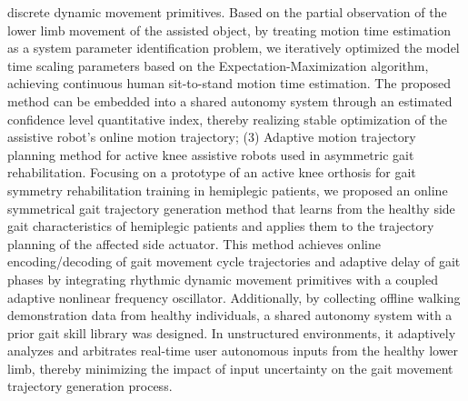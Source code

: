 \begin{abstract*}
discrete dynamic movement primitives. Based on the partial observation of the lower limb movement of the assisted object, by treating motion time estimation as a system parameter identification problem, we iteratively optimized the model time scaling parameters based on the Expectation-Maximization algorithm, achieving continuous human sit-to-stand motion time estimation. The proposed method can be embedded into a shared autonomy system through an estimated confidence level quantitative index, thereby realizing stable optimization of the assistive robot's online motion trajectory; (3) Adaptive motion trajectory planning method for active knee assistive robots used in asymmetric gait rehabilitation. Focusing on a prototype of an active knee orthosis for gait symmetry rehabilitation training in hemiplegic patients, we proposed an online symmetrical gait trajectory generation method that learns from the healthy side gait characteristics of hemiplegic patients and applies them to the trajectory planning of the affected side actuator. This method achieves online encoding/decoding of gait movement cycle trajectories and adaptive delay of gait phases by integrating rhythmic dynamic movement primitives with a coupled adaptive nonlinear frequency oscillator. Additionally, by collecting offline walking demonstration data from healthy individuals, a shared autonomy system with a prior gait skill library was designed. In unstructured environments, it adaptively analyzes and arbitrates real-time user autonomous inputs from the healthy lower limb, thereby minimizing the impact of input uncertainty on the gait movement trajectory generation process.
\end{abstract*}
